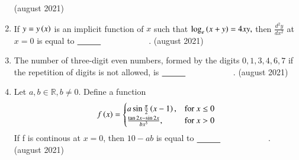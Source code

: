 \documentclass[journal,12pt,onecolumn]{IEEEtran}
\theoremstyle{remark}
\begin{document}
\begin{enumerate}
\hfill{(august 2021)}  
\item If $y=y\left(x\right)$ is an implicit function of $x$ such that $\log_{e}\left(x+y\right)=4xy,$ then $\frac{d^2y}{dx^2}$ at $x=0$ is equal to $\makebox[3cm][l]{\underline{\hspace{1cm}}}$.
\hfill{(august 2021)}  
\item The number of three-digit even numbers, formed by the digits $0, 1, 3, 4, 6, 7$ if the repetition of digits is not allowed, is $\makebox[3cm][l]{\underline{\hspace{1cm}}}$.
\hfill{(august 2021)}  
\item Let $a,b \in \mathbb{R}, b\neq 0$. Define a function 
       \[
       f\left(x\right)=
       \begin{cases}
           a\sin\frac{\pi}{2}\left(x-1\right),&\text{for }x\leq 0\\
           \frac{\tan 2x -\sin 2x}{bx^{3}},&\text{for }x>0
       \end{cases}
       \]
       If f is continous at $x=0$, then $10-ab$ is equal to  $\makebox[3cm][l]{\underline{\hspace{1cm}}}$.
			 \hfill{(august 2021)}  
\end{enumerate}
\end{document}
